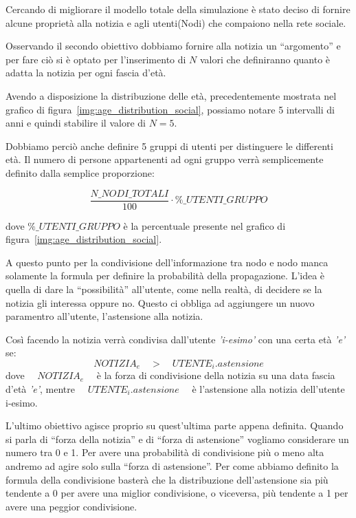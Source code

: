 Cercando di migliorare il modello totale della simulazione è stato deciso di fornire alcune proprietà alla notizia e 
agli utenti(Nodi) che compaiono nella rete sociale.

Osservando il secondo obiettivo dobbiamo fornire alla notizia un ``argomento'' e per fare ciò si 
è optato per l'inserimento di $N$ valori che definiranno quanto è adatta la notizia per ogni fascia d'età.

Avendo a disposizione la distribuzione delle età, precedentemente mostrata nel grafico di figura~\ref{img:age_distribution_social},
possiamo notare 5 intervalli di anni e quindi stabilire il valore di $N = 5$.

Dobbiamo perciò anche definire 5 gruppi di utenti per distinguere le differenti età.
Il numero di persone appartenenti ad ogni gruppo verrà semplicemente definito dalla semplice proporzione:

\[
\frac{N\_NODI\_TOTALI}{100} \cdot \%\_UTENTI\_GRUPPO
\]

dove $\%\_UTENTI\_GRUPPO$ è la percentuale presente nel grafico di figura~\ref{img:age_distribution_social}.

A questo punto per la condivisione dell'informazione tra nodo e nodo manca solamente la formula per definire la probabilità 
della propagazione.
L'idea è quella di dare la ``possibilità'' all'utente, come nella realtà, di decidere se la 
notizia gli interessa oppure no. 
Questo ci obbliga ad aggiungere un nuovo paramentro all'utente, l'astensione alla notizia.

Così facendo la notizia verrà condivisa dall'utente \emph{'i-esimo'} con una certa età \emph{'e'} se:
\[
NOTIZIA_e \quad > \quad UTENTE_i.astensione
\]
dove $\quad NOTIZIA_e \quad$ è la forza di condivisione della notizia su una data fascia d'età \emph{'e'}, 
mentre $\quad UTENTE_i.astensione \quad$ è l'astensione alla notizia dell'utente i-esimo.

L'ultimo obiettivo agisce proprio su quest'ultima parte appena definita.
Quando si parla di ``forza della notizia'' e di ``forza di astensione'' vogliamo considerare un numero tra 0 e 1.
Per avere una probabilità di condivisione più o meno alta andremo ad agire solo sulla ``forza di astensione''.
Per come abbiamo definito la formula della condivisione basterà che la distribuzione dell'astensione sia più 
tendente a 0 per avere una miglior condivisione, o viceversa, più tendente a 1 per avere una peggior
condivisione.

